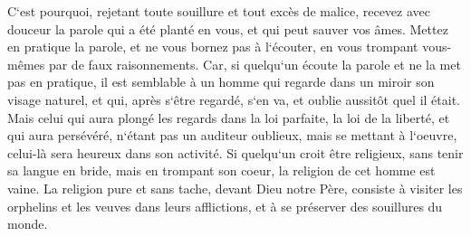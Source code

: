 \verse C`est pourquoi, rejetant toute souillure et tout excès de malice, recevez avec douceur la parole qui a été planté en vous, et qui peut sauver vos âmes. 
\verse Mettez en pratique la parole, et ne vous bornez pas à l`écouter, en vous trompant vous-mêmes par de faux raisonnements. 
\verse Car, si quelqu`un écoute la parole et ne la met pas en pratique, il est semblable à un homme qui regarde dans un miroir son visage naturel, 
\verse et qui, après s`être regardé, s`en va, et oublie aussitôt quel il était. 
\verse Mais celui qui aura plongé les regards dans la loi parfaite, la loi de la liberté, et qui aura persévéré, n`étant pas un auditeur oublieux, mais se mettant à l`oeuvre, celui-là sera heureux dans son activité. 
\verse Si quelqu`un croit être religieux, sans tenir sa langue en bride, mais en trompant son coeur, la religion de cet homme est vaine. 
\verse La religion pure et sans tache, devant Dieu notre Père, consiste à visiter les orphelins et les veuves dans leurs afflictions, et à se préserver des souillures du monde. 

\chapter{}

